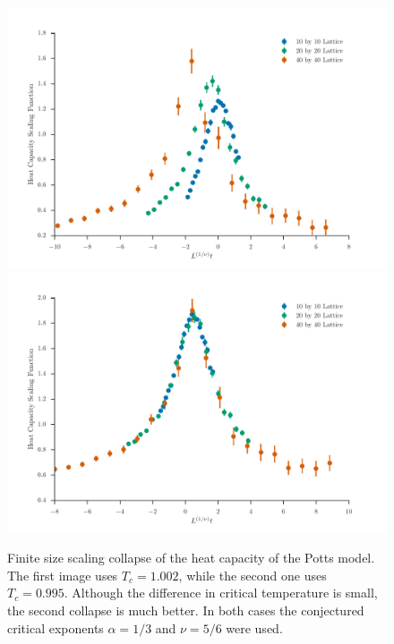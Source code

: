 \documentclass[11pt, a4paper]{report} %
\begin{document}
\begin{figure}
	\centering
	\includegraphics[width=\linewidth]{potts_heat_capacity_data_collapse_poor.pdf}
	\includegraphics[width=\linewidth]{potts_heat_capacity_data_collapse.pdf}
	\caption{Finite size scaling collapse of the heat capacity of the Potts model. The first image uses \(T_c=1.002\), while the second one uses \(T_c=0.995\). Although the difference in critical temperature is small, the second collapse is much better. In both cases the conjectured critical exponents \(\alpha=1/3\) and \(\nu=5/6\) were used.}
	\label{fig:potts_heat_capacity_collapse}
\end{figure}
\end{document}
